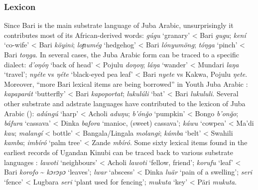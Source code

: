 \documentclass[output=paper]{langsci/langscibook}
\begin{document}
 \subsubsection{Lexicon}

Since Bari is the main substrate language of Juba Arabic, unsurprisingly it contributes most of its African-derived words: \textit{gúgu} ‘granary’ < Bari \textit{gugu}; \textit{kení} ‘co-wife’ < Bari \textit{köyini}; \textit{loɲumég} `hedgehog' < Bari \textit{lónyumöng}; \textit{tóŋga} ‘pinch’ < Bari \textit{toŋga}. In several cases, the Juba Arabic form can be traced to a specific dialect: \textit{d'oŋóŋ} ‘back of head’ < Pojulu \textit{doŋoŋ}; \textit{láŋa} ‘wander’ < Mundari \textit{laŋa} ‘travel’; \textit{nyéte} vs \textit{ŋéte} ‘black-eyed pea leaf’ < Bari \textit{nyete} vs Kakwa, Pojulu \textit{ŋete}. Moreover, “more Bari lexical items are being borrowed” in Youth Juba Arabic \citep[131]{Nakao2012}: \textit{kapaparát} ‘butterfly’ < Bari \textit{kapoportat}; \textit{lukulúli} ‘bat’ < Bari \textit{lukululi}. Several other substrate and adstrate languages have contributed to the lexicon of Juba Arabic (\citealt{Nakao2012,Nakao2015}): \textit{adúngú} ‘harp’ < Acholi \textit{aduŋu}; \textit{b'ónǧ}\textit{o} ‘pumpkin’ < Bongo \textit{b'onǧo}; \textit{báfura} ‘cassava’ < Dinka \textit{bafora} ‘manioc, (sweet) cassava’; \textit{káwu} ‘cowpea’ < Ma'di \textit{kau}; \textit{malangí} < bottle’ < Bangala/Lingala \textit{molangi}; \textit{kámba} ‘belt’ < Swahili \textit{kamba}; \textit{imbíró} ‘palm tree’ < Zande \textit{mbíró}. Some sixty lexical items found in the earliest records of Ugandan Kinubi can be traced back to various substrate languages \citep{Avram2017talk}: \textit{lawoti} ‘neighbours’ < Acholi \textit{lawoti} ‘fellow, friend’; \textit{korufu} ‘leaf’ < Bari \textit{korofo} {\textasciitilde} \textit{kɔrɔ}\textit{pɔ} ‘leaves’; \textit{lwar} ‘abscess’ < Dinka \textit{luär} ‘pain of a swelling’; \textit{seri} ‘fence’ < Lugbara \textit{seri} ‘plant used for fencing’; \textit{mukuta} ‘key’ < Päri \textit{mukuta}.
\end{document}
